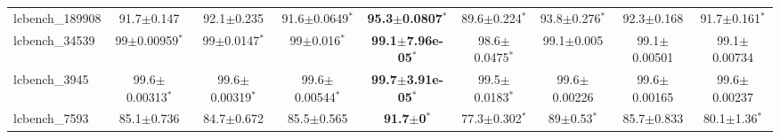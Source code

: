 \begin{table}[t]
\begin{center}
\begin{tabular}{lcccccccc}
lcbench\_189908 & 91.7$\pm$0.147 & 92.1$\pm$0.235 & 91.6$\pm$0.0649$^{*}$ & \textbf{95.3$\pm$0.0807}$^{*}$ & 89.6$\pm$0.224$^{*}$ & 93.8$\pm$0.276$^{*}$ & 92.3$\pm$0.168 & 91.7$\pm$0.161$^{*}$ \\
lcbench\_34539 & 99$\pm$0.00959$^{*}$ & 99$\pm$0.0147$^{*}$ & 99$\pm$0.016$^{*}$ & \textbf{99.1$\pm$7.96e-05}$^{*}$ & 98.6$\pm$0.0475$^{*}$ & 99.1$\pm$0.005 & 99.1$\pm$0.00501 & 99.1$\pm$0.00734 \\
lcbench\_3945 & 99.6$\pm$0.00313$^{*}$ & 99.6$\pm$0.00319$^{*}$ & 99.6$\pm$0.00544$^{*}$ & \textbf{99.7$\pm$3.91e-05}$^{*}$ & 99.5$\pm$0.0183$^{*}$ & 99.6$\pm$0.00226 & 99.6$\pm$0.00165 & 99.6$\pm$0.00237 \\
lcbench\_7593 & 85.1$\pm$0.736 & 84.7$\pm$0.672 & 85.5$\pm$0.565 & \textbf{91.7$\pm$0}$^{*}$ & 77.3$\pm$0.302$^{*}$ & 89$\pm$0.53$^{*}$ & 85.7$\pm$0.833 & 80.1$\pm$1.36$^{*}$ \\
\hline
\end{tabular}
\end{center}
\end{table}